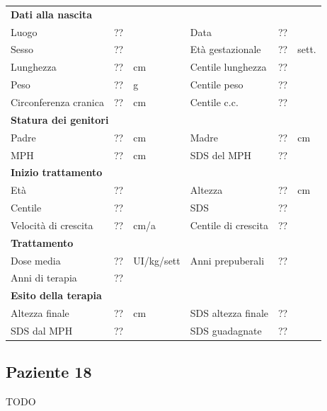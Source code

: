 \begin{table}[!h]
\begin{tabular}{lrllrl}
\toprule
\multicolumn{6}{l}{\textbf{Dati alla nascita}}\\
Luogo 		& \multicolumn{2}{l}{??} 	& Data 					& \multicolumn{2}{l}{??} 	\\
Sesso 		& \multicolumn{2}{l}{??} 	& Età gestazionale 		& ?? 		& sett.\\
Lunghezza 	& ?? 		& cm 				& Centile lunghezza		& ?? 		\\
Peso 		& ?? 		& g					& Centile peso			& ?? 		\\
Circonferenza cranica	& ?? 		& cm 	& Centile c.c.			& ?? \\
\midrule
\multicolumn{6}{l}{\textbf{Statura dei genitori}}\\
Padre 		& ?? & cm 	& Madre 				& ?? & cm \\
MPH 		& ?? & cm 	& SDS del MPH 			& ??\\
\midrule
\multicolumn{6}{l}{\textbf{Inizio trattamento}} \\
Età	& ?? & 		& Altezza 				& ?? & cm  \\
Centile & ?? 	 &		& SDS		& ?? \\
Velocità di crescita & ?? & cm/a	& Centile di crescita & ??\\
\midrule
\multicolumn{6}{l}{\textbf{Trattamento}} \\
Dose media		& ?? & UI/kg/sett & Anni prepuberali & ??\\
Anni di terapia & ??\\
\midrule
\multicolumn{6}{l}{\textbf{Esito della terapia}} \\
Altezza finale			& ?? & cm 	& SDS altezza finale		& ??\\
SDS dal MPH				& ?? &		& SDS guadagnate 			& ??\\
\bottomrule
\end{tabular}
\end{table}
\clearpage


\subsection*{Paziente 18}

TODO

